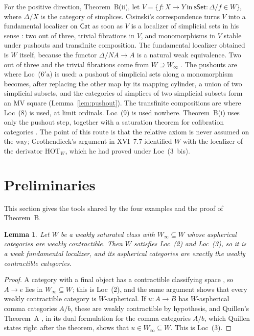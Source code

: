\documentclass[11pt,a4paper]{article}
\newtheorem{lemma}[theorem]{Lemma}
\theoremstyle{definition}
\newcommand{\Cat}{\mathsf{Cat}}
\newcommand{\sSet}{\mathsf{sSet}}
\newcommand{\Winf}{W_{\infty}}
\begin{document}
For the positive direction, Theorem~B(ii), let
$V=\{f\colon X\to Y\ \text{in}\ \sSet: \Delta/f\in W\}$, where $\Delta/X$ is the category of
simplices. Cisinski's correspondence \cite[Th.~4.2.15]{Cis06} turns $V$ into a fundamental
localizer on $\Cat$ as soon as $V$ is a localizer of simplicial sets in his sense
\cite[D\'ef.~1.4.1]{Cis06}: two out of three, trivial fibrations in $V$, and monomorphisms in
$V$ stable under pushouts and transfinite composition. The fundamental localizer obtained is
$W$ itself, because the functor $\Delta/NA\to A$ is a natural weak equivalence. Two out of
three and the trivial fibrations come from $W\supseteq\Winf$ \cite[Th.~6.1.18]{Cis06}. The
pushouts are where Loc~($6'$a) is used: a pushout of simplicial sets along a monomorphism
becomes, after replacing the other map by its mapping cylinder, a union of two simplicial
subsets, and the categories of simplices of two simplicial subsets form an MV square
(Lemma~\ref{lem:pushout}). The transfinite compositions are where Loc~(8) is used, at limit
ordinals. Loc~(9) is used nowhere. Theorem~B(i) uses only the pushout step, together with a
saturation theorem for cofibration categories \cite[Th.~7.2.7]{RB09}. The point of this route
is that the relative axiom is never assumed on the way; Grothendieck's argument in XVI~7.7
identified $W$ with the localizer of the derivator $\mathrm{HOT}_W$, which he had proved under
Loc~(3~bis).

\section{Preliminaries}\label{sec:prelim}

This section gives the tools shared by the four examples and the proof of Theorem~B.

\begin{lemma}\label{lem:absolute}
Let $W$ be a weakly saturated class with $\Winf\subseteq W$ whose aspherical categories are
weakly contractible. Then $W$ satisfies Loc~\textup{(2)} and Loc~\textup{(3)}, so it is a weak
fundamental localizer, and its aspherical categories are exactly the weakly contractible
categories.
\end{lemma}

\begin{proof}
A category with a final object has a contractible classifying space \cite[\S1, Corollary~2 of Proposition~2]{Qui73},
so $A\to e$ lies in $\Winf\subseteq W$; this is Loc~(2), and the same argument shows that
every weakly contractible category is $W$-aspherical. If $u\colon A\to B$ has $W$-aspherical
comma categories $A/b$, these are weakly contractible by hypothesis, and Quillen's Theorem~A
\cite[\S1, Th.~A]{Qui73}, in its dual formulation for the comma categories $A/b$, which Quillen
states right after the theorem, shows that
$u\in\Winf\subseteq W$. This is Loc~(3).
\end{proof}
\end{document}
